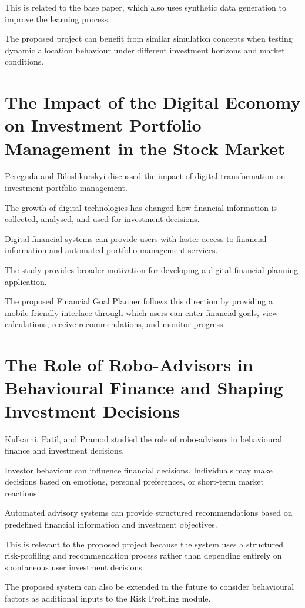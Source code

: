 This is related to the base paper, which also uses synthetic data generation to improve the learning process.

The proposed project can benefit from similar simulation concepts when testing dynamic allocation behaviour under different investment horizons and market conditions.

\section{The Impact of the Digital Economy on Investment Portfolio Management in the Stock Market}
Pereguda and Biloshkurskyi discussed the impact of digital transformation on investment portfolio management.

The growth of digital technologies has changed how financial information is collected, analysed, and used for investment decisions.

Digital financial systems can provide users with faster access to financial information and automated portfolio-management services.

The study provides broader motivation for developing a digital financial planning application.

The proposed Financial Goal Planner follows this direction by providing a mobile-friendly interface through which users can enter financial goals, view calculations, receive recommendations, and monitor progress.

\section{The Role of Robo-Advisors in Behavioural Finance and Shaping Investment Decisions}
Kulkarni, Patil, and Pramod studied the role of robo-advisors in behavioural finance and investment decisions.

Investor behaviour can influence financial decisions. Individuals may make decisions based on emotions, personal preferences, or short-term market reactions.

Automated advisory systems can provide structured recommendations based on predefined financial information and investment objectives.

This is relevant to the proposed project because the system uses a structured risk-profiling and recommendation process rather than depending entirely on spontaneous user investment decisions.

The proposed system can also be extended in the future to consider behavioural factors as additional inputs to the Risk Profiling module.

